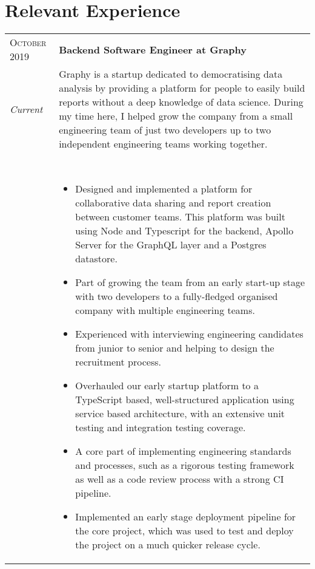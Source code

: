 

\section{Relevant Experience}\label{sec:relevant-experience}

\begin{tabular}{p{60pt}|p{11cm}}
    \hspace*{\fill}\textsc{October 2019} & \textbf{Backend Software Engineer at Graphy} \\

    \hspace*{\fill}\emph{Current}& \small{
        Graphy is a startup dedicated to democratising data analysis by providing a platform for people to easily build reports without a deep knowledge of data science.
        During my time here, I helped grow the company from a small engineering team of just two developers up to two independent engineering teams working together.
    } \\
    \ & \vspace{1pt} \\
    \hspace*{\fill}       & \vspace{-0.9em}
    \begin{itemize}[itemsep=0pt,topsep=0pt,leftmargin=*]
        \small
        \item Designed and implemented a platform for collaborative data sharing and report creation between customer teams.
        This platform was built using Node and Typescript for the backend, Apollo Server for the GraphQL layer and a Postgres datastore.
        \item Part of growing the team from an early start-up stage with two developers to a fully-fledged organised company with multiple engineering teams.
        \item Experienced with interviewing engineering candidates from junior to senior and helping to design the recruitment process.
        \item Overhauled our early startup platform to a TypeScript based, well-structured application using service based architecture, with an extensive unit testing and integration testing coverage.
        \item A core part of implementing engineering standards and processes, such as a rigorous testing framework as well as a code review process with a strong CI pipeline.
        \item Implemented an early stage deployment pipeline for the core project, which was used to test and deploy the project on a much quicker release cycle.
    \end{itemize}
\end{tabular} \\ \\ \\

